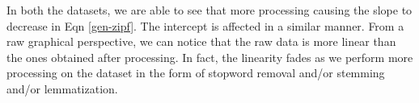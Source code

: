 \documentclass{article}
\begin{document}
\begin{flushleft}
In both the datasets, we are able to see that more processing causing the slope to decrease in Eqn \ref{gen-zipf}. The intercept is affected in a similar manner. From a raw graphical perspective, we can notice that the raw data is more linear than the ones obtained after processing. In fact, the linearity fades as we perform more processing on the dataset in the form of stopword removal and/or stemming and/or lemmatization.
\end{flushleft}
\end{document}
